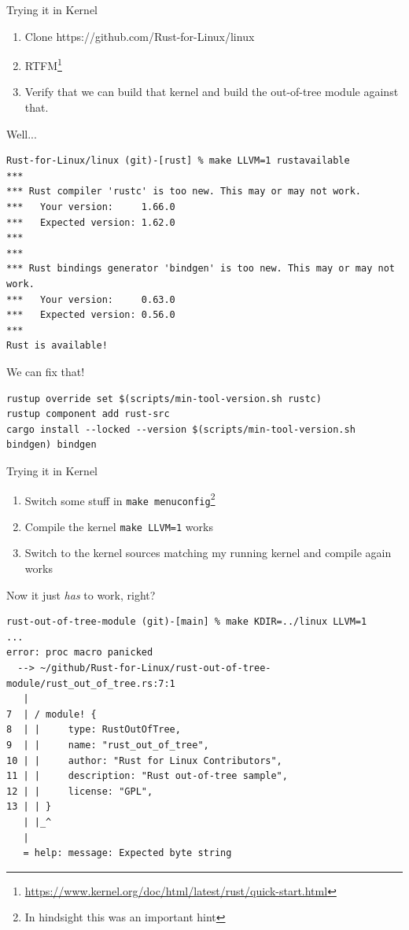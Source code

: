 \begin{frame}[c,fragile]{Trying it in Kernel}
\begin{enumerate}
\item Clone https://github.com/Rust-for-Linux/linux
\item RTFM\footnote{\url{https://www.kernel.org/doc/html/latest/rust/quick-start.html}}
\item Verify that we can build that kernel and build the out-of-tree module against that.
\end{enumerate}
\end{frame}

\begin{frame}[c,fragile]{Well...}
\begin{verbatim}
Rust-for-Linux/linux (git)-[rust] % make LLVM=1 rustavailable
***
*** Rust compiler 'rustc' is too new. This may or may not work.
***   Your version:     1.66.0
***   Expected version: 1.62.0
***
***
*** Rust bindings generator 'bindgen' is too new. This may or may not work.
***   Your version:     0.63.0
***   Expected version: 0.56.0
***
Rust is available!
\end{verbatim}
\end{frame}

\begin{frame}[c,fragile]{We can fix that!}
\begin{verbatim}
rustup override set $(scripts/min-tool-version.sh rustc)
rustup component add rust-src
cargo install --locked --version $(scripts/min-tool-version.sh bindgen) bindgen
\end{verbatim}
\end{frame}

\begin{frame}[c,fragile]{Trying it in Kernel}
\begin{enumerate}
\item Switch some stuff in \texttt{make menuconfig}\footnote{In hindsight this was an important hint}
\item Compile the kernel \texttt{make LLVM=1} \rightarrow{} works
\item Switch to the kernel sources matching my running kernel and compile again \rightarrow{} works
\end{enumerate}
\end{frame}

\begin{frame}[c,fragile]{Now it just \emph{has} to work, right?}
\pause
\begin{verbatim}
rust-out-of-tree-module (git)-[main] % make KDIR=../linux LLVM=1
...
error: proc macro panicked
  --> ~/github/Rust-for-Linux/rust-out-of-tree-module/rust_out_of_tree.rs:7:1
   |
7  | / module! {
8  | |     type: RustOutOfTree,
9  | |     name: "rust_out_of_tree",
10 | |     author: "Rust for Linux Contributors",
11 | |     description: "Rust out-of-tree sample",
12 | |     license: "GPL",
13 | | }
   | |_^
   |
   = help: message: Expected byte string
\end{verbatim}
\end{frame}

